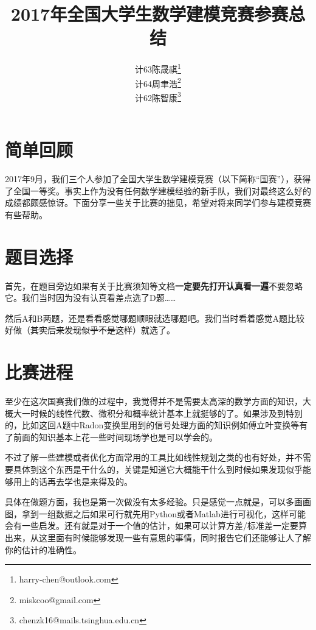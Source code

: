 \documentclass{ctexart}
\newcommand{\arttitle}{2017年全国大学生数学建模竞赛参赛总结}
\begin{document}
\title{\bfseries{\arttitle}}
\author{
	计63\hspace{1em}陈晟祺\thanks{harry-chen@outlook.com}\\
    计64\hspace{1em}周聿浩\thanks{miskcoo@gmail.com}\\
    计62\hspace{1em}陈智康\thanks{chenzk16@mails.tsinghua.edu.cn}
}
\date{}
\maketitle

\section{简单回顾}
2017年9月，我们三个人参加了全国大学生数学建模竞赛（以下简称“国赛”），获得了全国一等奖。事实上作为没有任何数学建模经验的新手队，我们对最终这么好的成绩都颇感惊讶。下面分享一些关于比赛的拙见，希望对将来同学们参与建模竞赛有些帮助。

\section{题目选择}
首先，在题目旁边如果有关于比赛须知等文档{\bf 一定要先打开认真看一遍}不要忽略它。我们当时因为没有认真看差点选了D题……

然后A和B两题，还是看看感觉哪题顺眼就选哪题吧。我们当时看着感觉A题比较好做（\sout{其实后来发现似乎不是这样}）就选了。

\section{比赛进程}
至少在这次国赛我们做的过程中，我觉得并不是需要太高深的数学方面的知识，大概大一时候的线性代数、微积分和概率统计基本上就挺够的了。如果涉及到特别的，比如这回A题中Radon变换里用到的信号处理方面的知识例如傅立叶变换等有了前面的知识基本上花一些时间现场学也是可以学会的。

不过了解一些建模或者优化方面常用的工具比如线性规划之类的也有好处，并不需要具体到这个东西是干什么的，关键是知道它大概能干什么到时候如果发现似乎能够用上的话再去学也是来得及的。

具体在做题方面，我也是第一次做没有太多经验。只是感觉一点就是，可以多画画图，拿到一组数据之后如果可行就先用Python或者Matlab进行可视化，这样可能会有一些启发。还有就是对于一个值的估计，如果可以计算方差/标准差一定要算出来，从这里面有时候能够发现一些有意思的事情，同时报告它们还能够让人了解你的估计的准确性。
\end{document}
